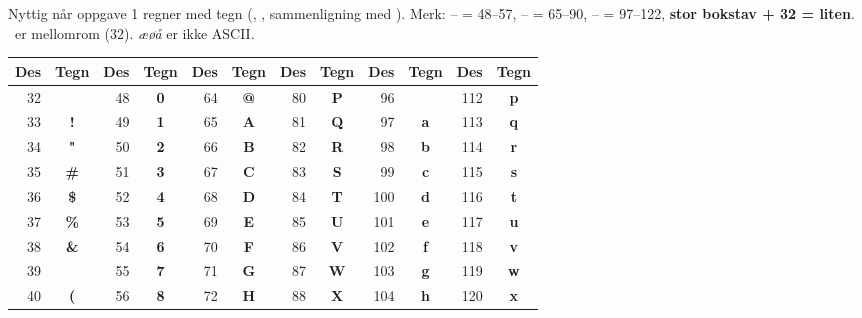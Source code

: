 
\label{kap:ascii}
Nyttig når oppgave 1 regner med tegn (, , sammenligning med ).
Merk: -- = 48--57, -- = 65--90, -- = 97--122, \textbf{stor bokstav + 32 = liten}.
\textvisiblespace\ er mellomrom (32). \emph{æøå} er ikke ASCII.

\begin{center}
{\ttfamily\small\setlength{\tabcolsep}{4pt}\renewcommand{\arraystretch}{1.15}
\begin{tabular}{@{}*{6}{r>{\columncolor{frodeblue!6}}c@{\hspace{10pt}}}@{}}
\toprule
\textbf{Des} & \textbf{Tegn} & \textbf{Des} & \textbf{Tegn} & \textbf{Des} & \textbf{Tegn} & \textbf{Des} & \textbf{Tegn} & \textbf{Des} & \textbf{Tegn} & \textbf{Des} & \textbf{Tegn} \\
\midrule
32 & \textbf{\textvisiblespace} & 48 & \textbf{0} & 64 & \textbf{@} & 80 & \textbf{P} & 96 & \textbf{\textasciigrave{}} & 112 & \textbf{p} \\
33 & \textbf{!} & 49 & \textbf{1} & 65 & \textbf{A} & 81 & \textbf{Q} & 97 & \textbf{a} & 113 & \textbf{q} \\
34 & \textbf{"} & 50 & \textbf{2} & 66 & \textbf{B} & 82 & \textbf{R} & 98 & \textbf{b} & 114 & \textbf{r} \\
35 & \textbf{\#} & 51 & \textbf{3} & 67 & \textbf{C} & 83 & \textbf{S} & 99 & \textbf{c} & 115 & \textbf{s} \\
36 & \textbf{\$} & 52 & \textbf{4} & 68 & \textbf{D} & 84 & \textbf{T} & 100 & \textbf{d} & 116 & \textbf{t} \\
37 & \textbf{\%} & 53 & \textbf{5} & 69 & \textbf{E} & 85 & \textbf{U} & 101 & \textbf{e} & 117 & \textbf{u} \\
38 & \textbf{\&} & 54 & \textbf{6} & 70 & \textbf{F} & 86 & \textbf{V} & 102 & \textbf{f} & 118 & \textbf{v} \\
39 & \textbf{\textquotesingle{}} & 55 & \textbf{7} & 71 & \textbf{G} & 87 & \textbf{W} & 103 & \textbf{g} & 119 & \textbf{w} \\
40 & \textbf{(} & 56 & \textbf{8} & 72 & \textbf{H} & 88 & \textbf{X} & 104 & \textbf{h} & 120 & \textbf{x} \\

\end{tabular}}
\end{center}
